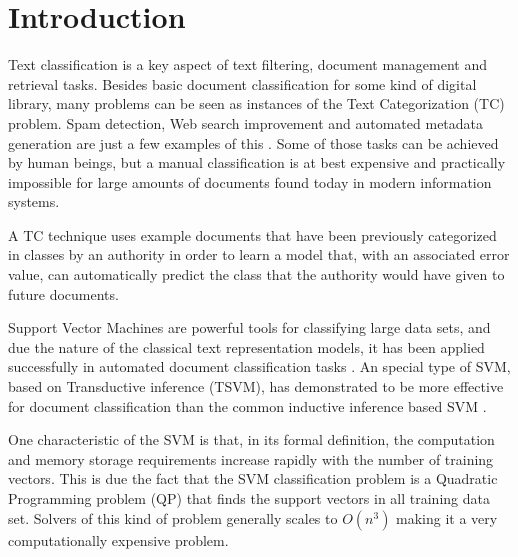 \section{Introduction}

Text classification is a key aspect of text filtering, document management
and retrieval tasks. Besides basic document classification for some
kind of digital library, many problems can be seen as instances of
the Text Categorization (TC) problem. Spam detection, Web search
improvement and automated metadata generation are just a few examples
of this \cite{Sebastiani02}.  Some of those tasks can be achieved
by human beings, but a manual classification is at best expensive
and practically impossible for large amounts of documents found today
in modern information systems.

A TC technique uses example documents that have been previously categorized
in classes by an authority in order to learn a model that, with an
associated error value, can automatically predict the class that the
authority would have given to future documents. 

Support Vector Machines \cite{Vapnik98} are powerful tools for classifying
large data sets, and due the nature of the classical text representation
models, it has been applied successfully in automated document classification
tasks \cite{Joachims98,Joachims99c}. An special type of SVM, based
on Transductive inference (TSVM), has demonstrated to be more effective
for document classification than the common inductive inference based
SVM \cite{Joachims99c}.

One characteristic of the SVM is that, in its formal definition, the
computation and memory storage requirements increase rapidly with
the number of training vectors. This is due the fact that the SVM
classification problem is a Quadratic Programming problem (QP) that
finds the support vectors in all training data set. Solvers of this
kind of problem generally scales to $O(n^{3})$ making it a very computationally
expensive problem.


